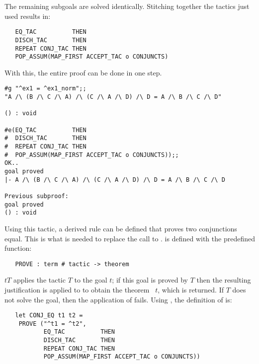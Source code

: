 \noindent The remaining subgoals are solved identically. Stitching together
the tactics just used results in:

\begin{hol}\begin{verbatim}
   EQ_TAC          THEN 
   DISCH_TAC       THEN
   REPEAT CONJ_TAC THEN 
   POP_ASSUM(MAP_FIRST ACCEPT_TAC o CONJUNCTS)
\end{verbatim}\end{hol}

\noindent With this, the entire proof can be done in one step.

\begin{session}\begin{verbatim}
#g "^ex1 = ^ex1_norm";;
"A /\ (B /\ C /\ A) /\ (C /\ A /\ D) /\ D = A /\ B /\ C /\ D"

() : void

#e(EQ_TAC          THEN 
#  DISCH_TAC       THEN
#  REPEAT CONJ_TAC THEN 
#  POP_ASSUM(MAP_FIRST ACCEPT_TAC o CONJUNCTS));;
OK..
goal proved
|- A /\ (B /\ C /\ A) /\ (C /\ A /\ D) /\ D = A /\ B /\ C /\ D

Previous subproof:
goal proved
() : void
\end{verbatim}\end{session}

Using this tactic, a derived rule  can be defined that proves
two conjunctions equal. This is what is needed to replace the call to
.
 is defined with the predefined function:

\begin{hol}\begin{verbatim}
   PROVE : term # tactic -> theorem
\end{verbatim}\end{hol}

\noindent {}\ml{(}$t$\ml{,}$T$\ml{)} applies the tactic $T$ to
the goal \ml{([],}$t$\ml{)}; if this goal is proved by $T$ then the
resulting justification is applied to \ml{[]} to obtain the theorem
\ml{|-}~$t$, which is returned. If $T$ does not solve the goal, then
the application of  fails. Using , the definition
of  is:

\begin{hol}\begin{verbatim}
   let CONJ_EQ t1 t2 = 
    PROVE ("^t1 = ^t2", 
           EQ_TAC          THEN 
           DISCH_TAC       THEN
           REPEAT CONJ_TAC THEN 
           POP_ASSUM(MAP_FIRST ACCEPT_TAC o CONJUNCTS))
\end{verbatim}\end{hol}


